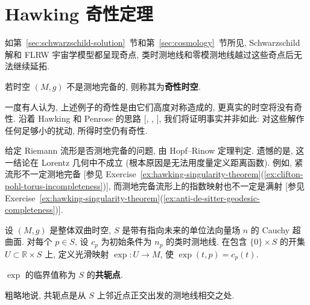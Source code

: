 \section{Hawking 奇性定理}\label{sec:hawking-singularity-theorem}

如第~\ref{sec:schwarzschild-solution}~节和第~\ref{sec:cosmology}~节所见, Schwarzschild 解和 FLRW 宇宙学模型都呈现奇点, 类时测地线和零模测地线越过这些奇点后无法继续延拓.

\begin{RiemannDefinition}\label{def:singular-spacetime}
若时空 $(M,g)$ 不是测地完备的, 则称其为\textbf{奇性时空}.
\end{RiemannDefinition}

一度有人认为, 上述例子的奇性是由它们高度对称造成的, 更真实的时空将没有奇性. 沿着 Hawking 和 Penrose 的思路 [, , ], 我们将证明事实并非如此: 对这些解作任何足够小的扰动, 所得时空仍有奇性.

给定 Riemann 流形是否测地完备的问题, 由 Hopf–Rinow 定理判定. 遗憾的是, 这一结论在 Lorentz 几何中不成立 (根本原因是无法用度量定义距离函数). 例如, 紧流形不一定测地完备 [参见 Exercise~\ref{ex:hawking-singularity-theorem}(\ref{ex:clifton-pohl-torus-incompleteness})], 而测地完备流形上的指数映射也不一定是满射 [参见 Exercise~\ref{ex:hawking-singularity-theorem}(\ref{ex:anti-de-sitter-geodesic-completeness})].

设 $(M,g)$ 是整体双曲时空, $S$ 是带有指向未来的单位法向量场 $n$ 的 Cauchy 超曲面. 对每个 $p\in S$, 设 $c_p$ 为初始条件为 $n_p$ 的类时测地线. 在包含 $\{0\}\times S$ 的开集 $U\subset\mathbb{R}\times S$ 上, 定义光滑映射 $\exp:U\to M$, 使 $\exp(t,p)=c_p(t)$.

\begin{RiemannDefinition}\label{def:conjugate-points-to-cauchy-hypersurface}
$\exp$ 的临界值称为 $S$ 的\textbf{共轭点}.
\end{RiemannDefinition}

粗略地说, 共轭点是从 $S$ 上邻近点正交出发的测地线相交之处.

